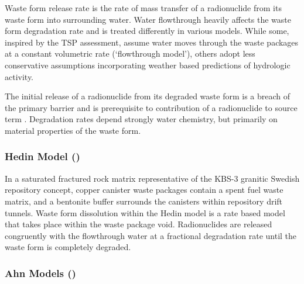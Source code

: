 Waste form release rate is the rate of mass transfer of a radionuclide from its 
waste form into surrounding water. Water flowthrough heavily affects the waste 
form degradation rate and is treated differently in various models.  While some, 
inspired by the TSP assessment, assume water moves through the waste packages at 
a constant volumetric rate (`flowthrough model'), others adopt less conservative 
assumptions incorporating weather based predictions of hydrologic activity.


The initial release of a radionuclide from its degraded waste form is a breach of the 
primary barrier and is prerequisite to contribution of a radionuclide to source 
term \cite{bracke_safety_2008}.  Degradation rates depend strongly water 
chemistry, but primarily on material properties of the waste form.









\subsubsection{Hedin Model (\cite{hedin_integrated_2002})}

In a saturated fractured rock matrix representative of the KBS-3 granitic
Swedish repository concept, copper canister waste packages contain a spent fuel
waste matrix, and a bentonite buffer surrounds the canisters within repository 
drift tunnels. Waste form dissolution within the Hedin model is a rate based
model that takes place within the waste package void. Radionuclides are 
released congruently with the flowthrough water at a fractional degradation 
rate until the waste form is completely degraded.
\cite{hedin_integrated_2002} 

\subsubsection{Ahn Models (\cite{ahn_environmental_2004,
ahn_environmental_2007})}

